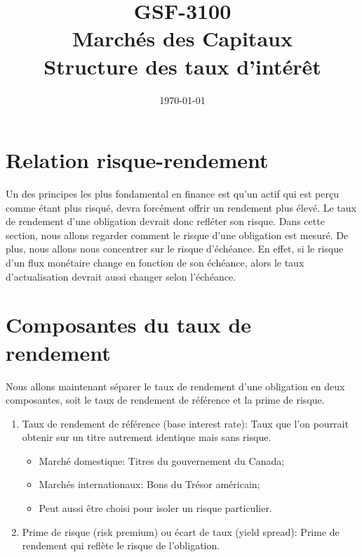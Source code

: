 \documentclass[12pt]{article}
\begin{document}
\begin{titlepage}
\title{GSF-3100 \\ Marchés des Capitaux \\ Structure des taux d’intérêt}
\date{\today}
\maketitle

\setcounter{page}{0}
\thispagestyle{empty}
\end{titlepage}
\pagebreak \newpage

\tableofcontents
\pagebreak \newpage
\section{Relation risque-rendement}
Un des principes les plus fondamental en finance est qu'un actif qui est perçu comme étant plus risqué,  devra forcément offrir un rendement plus élevé.  Le taux de rendement d’une obligation devrait donc refléter son risque.  Dans cette section, nous allons regarder comment le risque d'une obligation est mesuré.  De plus,  nous allons nous concentrer sur le risque d'échéance.  En effet,  si le risque d’un flux monétaire change en fonction de son échéance,  alors le taux d’actualisation devrait aussi changer selon l’échéance.
\section{Composantes du taux de rendement}
Nous allons maintenant séparer le taux de rendement d'une obligation en deux composantes,  soit le taux de rendement de référence et la prime de risque.

\begin{enumerate}
\item Taux de rendement de référence (base interest rate): Taux que l’on pourrait obtenir sur un titre autrement identique mais sans risque.
\begin{itemize}
\item Marché domestique: Titres du gouvernement du Canada;
\item Marchés internationaux: Bons du Trésor américain;
\item Peut aussi être choisi pour isoler un risque particulier.
\end{itemize}
\item Prime de risque (risk premium) ou écart de taux (yield spread): Prime de rendement qui reflète le risque de l’obligation.
\end{enumerate}
\newpage
\end{document}
